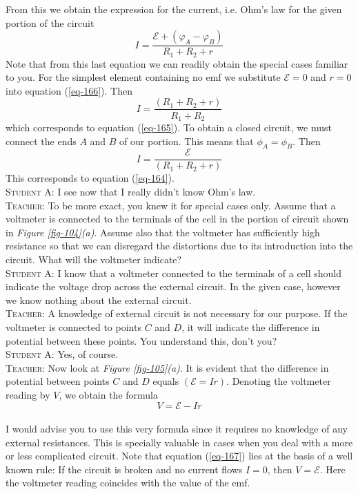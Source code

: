 \documentclass[a4paper,sfsidenotes]{tufte-book}
\newcommand{\Ea}{\mathcal{E}}
\begin{document}
From this we obtain the expression for the current, i.e. Ohm's law for the given portion of the circuit 
\begin{equation}%
I = \frac{\Ea + (\varphi_{A} - \varphi_{B})}{R_{1}+R_{2}+r} 
\label{eq-166}
\end{equation}
Note that from this last equation we can readily obtain the special cases familiar to you. For the simplest element containing no emf we substitute $\Ea=0$ and $r=0$ into equation (\ref{eq-166}). Then 
\begin{equation*}%
I = \frac{(R_{1}+R_{2}+r)}{R_{1}+R_{2}}
\end{equation*}
which corresponds to equation (\ref{eq-165}). To obtain a closed circuit, we must connect the ends $A$ and $B$ of our portion. This means that  $\phi_{A} = \phi_{B}$. Then 
\begin{equation*}
I = \frac{\Ea}{(R_{1}+R_{2}+r)}
\end{equation*}
This corresponds to equation (\ref{eq-164}).
\\
\textsc{Student A:} I see now that I really didn't know Ohm's law. 
\\
\textsc{Teacher:} To be more exact, you knew it for special cases only. Assume that a voltmeter is connected to the terminals of the cell in the portion of circuit shown in \emph{Figure \ref{fig-104}(a)}. Assume also that the voltmeter has sufficiently high resistance so that we can disregard the distortions due to its introduction into the circuit. What will the voltmeter indicate?
\\
\textsc{Student A:} I know that a voltmeter connected to the terminals of a cell should indicate the voltage drop across the external circuit. In the given case, however we know nothing about the external circuit.
\\
\textsc{Teacher:} A knowledge of external circuit is not necessary for our purpose. If the voltmeter is connected to points $C$ and $D$, it will indicate the difference in potential between these points. You understand this, don't you?
\\
\textsc{Student A:} Yes, of course.
\\
\textsc{Teacher:} Now look at \emph{Figure \ref{fig-105}(a)}. It is evident that the difference in potential between points $C$ and $D$ equals $(\Ea = Ir)$. Denoting the voltmeter reading by $V$, we obtain the formula 
\begin{equation}%
V = \Ea - Ir 
\label{eq-167}
\end{equation}
\\
I would advise you to use this very formula since it requires no knowledge of any external resistances. This is specially valuable in cases when you deal with a more or less complicated circuit. Note that equation (\ref{eq-167}) lies at the basis of a well known rule: If the circuit is broken and no current flows $I = 0$, then $V =\Ea$. Here the voltmeter reading coincides with the value of the emf. 
\end{document}
